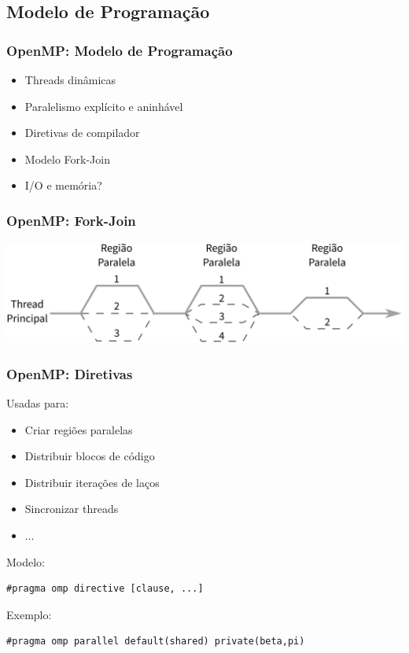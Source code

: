 \documentclass[10pt, compress]{beamer}
\begin{document}
\subsection{Modelo de Programação}

\begin{frame}
    \frametitle{OpenMP: Modelo de Programação}
    \begin{itemize}
        \item Threads \alert{dinâmicas}
        \item Paralelismo \alert{explícito e aninhável}
        \item \alert{Diretivas} de compilador
        \item Modelo \alert{Fork-Join}
        \item I/O e memória?
    \end{itemize}
\end{frame}

\begin{frame}
    \frametitle{OpenMP: Fork-Join}
    \begin{center}
        \includegraphics[width=\textwidth]{omp-fork-join}
    \end{center}
\end{frame}

\begin{frame}[fragile]
    \frametitle{OpenMP: Diretivas}
    Usadas para:
    \begin{itemize}
        \item Criar \alert{regiões paralelas}
        \item Distribuir \alert{blocos de código}
        \item Distribuir \alert{iterações de laços}
        \item \alert{Sincronizar threads}
        \item $\dots$
    \end{itemize}

    Modelo:
    \begin{lstlisting}[basicstyle=\ttfamily\scriptsize]
        #pragma omp directive [clause, ...]
    \end{lstlisting}

    Exemplo:
    \begin{lstlisting}[basicstyle=\ttfamily\scriptsize]
        #pragma omp parallel default(shared) private(beta,pi)
    \end{lstlisting}
\end{frame}
\end{document}
